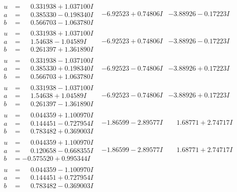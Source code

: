 \documentclass[1p]{elsarticle_modified}
\theoremstyle{definition}
\begin{document}
$$\begin{array}{c|c|c}
\begin{aligned}
u &= \phantom{-}0.331938 + 1.037100 I \\
a &= \phantom{-}0.385330 - 0.198340 I \\
b &= \phantom{-}0.566703 - 1.063780 I\end{aligned}
 & -6.92523 + 0.74806 I & -3.88926 - 0.17223 I \\ \hline\begin{aligned}
u &= \phantom{-}0.331938 + 1.037100 I \\
a &= \phantom{-}1.54638 - 1.04589 I \\
b &= \phantom{-}0.261397 + 1.361890 I\end{aligned}
 & -6.92523 + 0.74806 I & -3.88926 - 0.17223 I \\ \hline\begin{aligned}
u &= \phantom{-}0.331938 - 1.037100 I \\
a &= \phantom{-}0.385330 + 0.198340 I \\
b &= \phantom{-}0.566703 + 1.063780 I\end{aligned}
 & -6.92523 - 0.74806 I & -3.88926 + 0.17223 I \\ \hline\begin{aligned}
u &= \phantom{-}0.331938 - 1.037100 I \\
a &= \phantom{-}1.54638 + 1.04589 I \\
b &= \phantom{-}0.261397 - 1.361890 I\end{aligned}
 & -6.92523 - 0.74806 I & -3.88926 + 0.17223 I \\ \hline\begin{aligned}
u &= \phantom{-}0.044359 + 1.100970 I \\
a &= \phantom{-}0.144451 - 0.727954 I \\
b &= \phantom{-}0.783482 + 0.369003 I\end{aligned}
 & -1.86599 - 2.89577 I & \phantom{-}1.68771 + 2.74717 I \\ \hline\begin{aligned}
u &= \phantom{-}0.044359 + 1.100970 I \\
a &= \phantom{-}0.120658 - 0.668355 I \\
b &= -0.575520 + 0.995344 I\end{aligned}
 & -1.86599 - 2.89577 I & \phantom{-}1.68771 + 2.74717 I \\ \hline\begin{aligned}
u &= \phantom{-}0.044359 - 1.100970 I \\
a &= \phantom{-}0.144451 + 0.727954 I \\
b &= \phantom{-}0.783482 - 0.369003 I\end{aligned}

\end{array}$$
\end{document}
